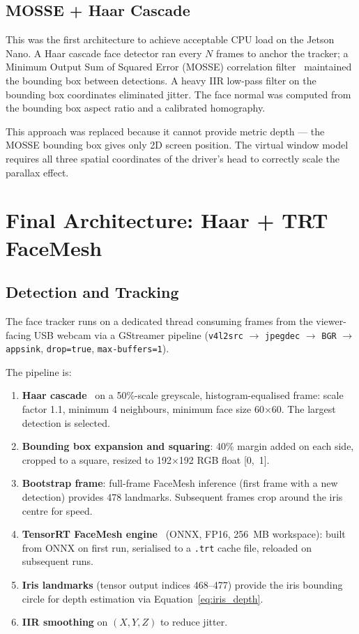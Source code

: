 \documentclass[11pt, a4paper]{report}
\begin{document}
\subsection{MOSSE + Haar Cascade}

This was the first architecture to achieve acceptable CPU load on the
Jetson Nano.
A Haar cascade face detector ran every $N$ frames to anchor the tracker;
a Minimum Output Sum of Squared Error (MOSSE) correlation
filter~\cite{bolme2010mosse} maintained the bounding box between
detections.
A heavy IIR low-pass filter on the bounding box coordinates eliminated
jitter.
The face normal was computed from the bounding box aspect ratio and a
calibrated homography.

This approach was replaced because it cannot provide metric depth ---
the MOSSE bounding box gives only 2D screen position.
The virtual window model requires all three spatial coordinates of the
driver's head to correctly scale the parallax effect.

\section{Final Architecture: Haar + TRT FaceMesh}

\subsection{Detection and Tracking}

The face tracker runs on a dedicated thread consuming frames from the
viewer-facing USB webcam via a GStreamer pipeline
(\texttt{v4l2src} $\to$ \texttt{jpegdec} $\to$ \texttt{BGR} $\to$ \texttt{appsink},
\texttt{drop=true}, \texttt{max-buffers=1}).

The pipeline is:

\begin{enumerate}[noitemsep]
    \item \textbf{Haar cascade}~\cite{viola2004robust} on a 50\%-scale
          greyscale, histogram-equalised frame: scale factor 1.1, minimum
          4 neighbours, minimum face size 60$\times$60.
          The largest detection is selected.
    \item \textbf{Bounding box expansion and squaring}: 40\% margin added
          on each side, cropped to a square, resized to 192$\times$192
          RGB float [0,~1].
    \item \textbf{Bootstrap frame}: full-frame FaceMesh inference (first
          frame with a new detection) provides 478 landmarks.
          Subsequent frames crop around the iris centre for speed.
    \item \textbf{TensorRT FaceMesh engine}~\cite{tensorrt,kartynnik2019facemesh}
          (ONNX, FP16, 256~MB workspace): built from ONNX on first run,
          serialised to a \texttt{.trt} cache file, reloaded on subsequent
          runs.
    \item \textbf{Iris landmarks} (tensor output indices 468--477) provide
          the iris bounding circle for depth estimation via
          Equation~\ref{eq:iris_depth}.
    \item \textbf{IIR smoothing} on $(X, Y, Z)$ to reduce jitter.
\end{enumerate}
\end{document}
